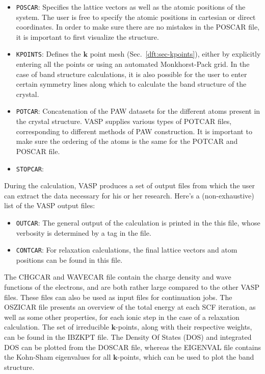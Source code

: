 \begin{refsection}
\begin{itemize}
 \label{appendix:sec-POSCAR}
\item \texttt{POSCAR}: Specifies the lattice vectors as well as the atomic positions of the system. The user is free to specify the atomic positions in cartesian or direct coordinates. In order to make sure there are no mistakes in the POSCAR file, it is important to first visualize the structure. 

 \label{appendix:sec-KPOINTS}
\item \texttt{KPOINTS}: Defines the $\mathbf{k}$ point mesh (Sec.~\ref{dft:sec-kpoints}), either by explicitly entering all the points or using an automated Monkhorst-Pack grid. In the case of band structure calculations, it is also possible for the user to enter certain symmetry lines along which to calculate the band structure of the crystal.

 \label{appendix:sec-POTCAR}
\item \texttt{POTCAR}: Concatenation of the PAW datasets for the different atoms present in the crystal structure. VASP supplies various types of POTCAR files, corresponding to different methods of PAW construction. It is important to make sure the ordering of the atoms is the same for the POTCAR and POSCAR file.

 \label{appendix:sec-STOPCAR}
\item \texttt{STOPCAR}:

\end{itemize}


During the calculation, VASP produces a set of output files from which the user can extract the data necessary for his or her research. Here's a (non-exhaustive) list of the VASP output files:

\begin{itemize}

 \label{appendix:sec-OUTCAR}
\item \texttt{OUTCAR}: The general output of the calculation is printed in the this file, whose verbosity is determined by a tag in the  file.

 \label{appendix:sec-CONTCAR}
\item \texttt{CONTCAR}: For relaxation calculations, the final lattice vectors and atom positions can be found in this file.

\end{itemize}

The CHGCAR and WAVECAR file contain the charge density and wave functions of the electrons, and are both rather large compared to the other VASP files. These files can also be used as input files for continuation jobs. The OSZICAR file presents an overview of the total energy at each SCF iteration, as well as some other properties, for each ionic step in the case of a relaxation calculation. The set of irreducible $\mathbf{k}$-points, along with their respective weights, can be found in the IBZKPT file. The Density Of States (DOS) and integrated DOS can be plotted from the DOSCAR file, whereas the EIGENVAL file contains the Kohn-Sham eigenvalues for all $\mathbf{k}$-points, which can be used to plot the band structure.


\end{refsection}
